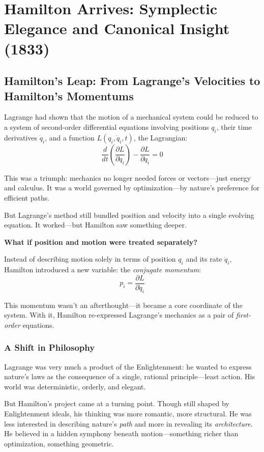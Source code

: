 \section{Hamilton Arrives: Symplectic Elegance and Canonical Insight (1833)}

\subsection{Hamilton’s Leap: From Lagrange’s Velocities to Hamilton’s Momentums}

Lagrange had shown that the motion of a mechanical system could be reduced to a system of second-order differential equations involving positions \( q_i \), their time derivatives \( \dot{q}_i \), and a function \( L(q_i, \dot{q}_i, t) \), the Lagrangian:
\[
\frac{d}{dt} \left( \frac{\partial L}{\partial \dot{q}_i} \right) - \frac{\partial L}{\partial q_i} = 0
\]

This was a triumph: mechanics no longer needed forces or vectors—just energy and calculus. It was a world governed by optimization—by nature’s preference for efficient paths.

But Lagrange’s method still bundled position and velocity into a single evolving equation. It worked—but Hamilton saw something deeper.

\vspace{1em}
\textbf{What if position and motion were treated separately?}

Instead of describing motion solely in terms of position \( q_i \) and its rate \( \dot{q}_i \), Hamilton introduced a new variable: the \emph{conjugate momentum}:
\[
p_i = \frac{\partial L}{\partial \dot{q}_i}
\]

This momentum wasn’t an afterthought—it became a core coordinate of the system. With it, Hamilton re-expressed Lagrange’s mechanics as a pair of \emph{first-order} equations.

\subsubsection*{A Shift in Philosophy}

Lagrange was very much a product of the Enlightenment: he wanted to express nature’s laws as the consequence of a single, rational principle—least action. His world was deterministic, orderly, and elegant.

But Hamilton’s project came at a turning point. Though still shaped by Enlightenment ideals, his thinking was more romantic, more structural. He was less interested in describing nature’s \textit{path} and more in revealing its \textit{architecture}. He believed in a hidden symphony beneath motion—something richer than optimization, something geometric.

